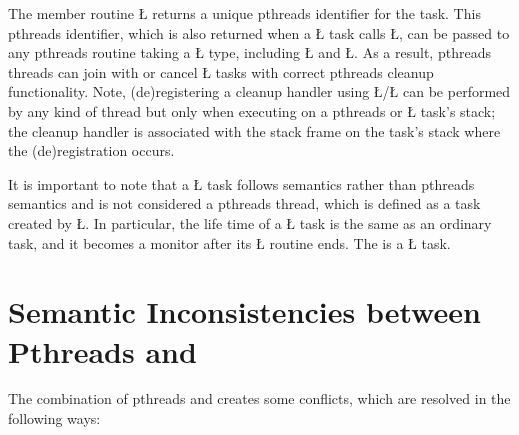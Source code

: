 \documentclass[openright,twoside]{report}
\begin{document}
The member routine \LGinlinetrue\LGbegin\lgrinde\L{}\endlgrinde\LGend{} returns a unique pthreads identifier for the task.
This pthreads identifier, which is also returned when a \LGinlinetrue\LGbegin\lgrinde\L{}\endlgrinde\LGend{} task calls \LGinlinetrue\LGbegin\lgrinde\L{}\endlgrinde\LGend{}, can be passed to any pthreads routine taking a \LGinlinetrue\LGbegin\lgrinde\L{}\endlgrinde\LGend{} type, including \LGinlinetrue\LGbegin\lgrinde\L{}\endlgrinde\LGend{} and \LGinlinetrue\LGbegin\lgrinde\L{}\endlgrinde\LGend{}.
As a result, pthreads threads can join with or cancel \LGinlinetrue\LGbegin\lgrinde\L{}\endlgrinde\LGend{} tasks with correct pthreads cleanup functionality.
Note, (de)registering a cleanup handler using \LGinlinetrue\LGbegin\lgrinde\L{}\endlgrinde\LGend{}/\-\LGinlinetrue\LGbegin\lgrinde\L{}\endlgrinde\LGend{} can be performed by any kind of thread but only when executing on a pthreads or \LGinlinetrue\LGbegin\lgrinde\L{}\endlgrinde\LGend{} task's stack;
the cleanup handler is associated with the stack frame on the task's stack where the (de)registration occurs.

It is important to note that a \LGinlinetrue\LGbegin\lgrinde\L{}\endlgrinde\LGend{} task follows \uC semantics rather than pthreads semantics and is not considered a pthreads thread, which is defined as a task created by \LGinlinetrue\LGbegin\lgrinde\L{}\endlgrinde\LGend{}.
In particular, the life time of a \LGinlinetrue\LGbegin\lgrinde\L{}\endlgrinde\LGend{} task is the same as an ordinary \uC task, and it becomes a monitor after its \LGinlinetrue\LGbegin\lgrinde\L{}\endlgrinde\LGend{} routine ends.
The  is a \LGinlinetrue\LGbegin\lgrinde\L{}\endlgrinde\LGend{} task.


\section{\texorpdfstring{Semantic Inconsistencies between Pthreads and \uC}{Semantic Inconsistencies between Pthreads and uC++}}

The combination of pthreads and \uC creates some conflicts, which are resolved in the following ways:
\end{document}
